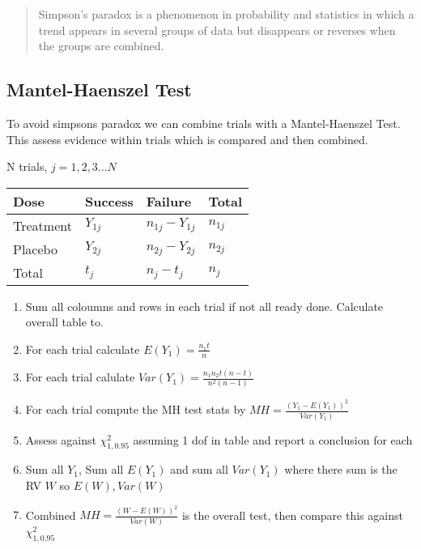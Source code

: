 \documentclass[
  letterpaper,
  DIV=11,
  numbers=noendperiod]{scrreprt}
\providecommand{\tightlist}{%
  \setlength{\itemsep}{0pt}\setlength{\parskip}{0pt}}\usepackage{longtable,booktabs,array}
\begin{document}
\begin{quote}
Simpson's paradox is a phenomenon in probability and statistics in which
a trend appears in several groups of data but disappears or reverses
when the groups are combined.
\end{quote}

\hypertarget{mantel-haenszel-test}{%
\subsection{Mantel-Haenszel Test}\label{mantel-haenszel-test}}

To avoid simpsons paradox we can combine trials with a Mantel-Haenszel
Test. This assess evidence within trials which is compared and then
combined.

N trials, \(j = 1,2,3 ... N\)

\begin{longtable}[]{@{}llll@{}}
\toprule()
Dose & Success & Failure & Total \\
\midrule()
\endhead
Treatment & \(Y_{1j}\) & \(n_{1j} - Y_{1j}\) & \(n_{1j}\) \\
Placebo & \(Y_{2j}\) & \(n_{2j} - Y_{2j}\) & \(n_{2j}\) \\
Total & \(t_j\) & \(n_{j} - t_{j}\) & \(n_{j}\) \\
\bottomrule()
\end{longtable}

\begin{enumerate}
\def\labelenumi{\arabic{enumi})}
\tightlist
\item
  Sum all coloumns and rows in each trial if not all ready done.
  Calculate overall table to.
\item
  For each trial calculate \(E(Y_1) = \frac{n_1 t}{n}\)
\item
  For each trial calulate \(Var(Y_1) = \frac{n_1 n_2 t(n-t)}{n^2(n-1)}\)
\item
  For each trial compute the MH test stats by
  \(MH = \frac{(Y_1 - E(Y_1))^2}{Var(Y_1)}\)
\item
  Assess against \(\chi^2_{1,0.95}\) assuming 1 dof in table and report
  a conclusion for each
\item
  Sum all \(Y_1\), Sum all \(E(Y_1)\) and sum all \(Var(Y_1)\) where
  there sum is the RV \(W\) so \(E(W), Var(W)\)
\item
  Combined \(MH = \frac{(W - E(W))^2}{Var(W)}\) is the overall test,
  then compare this against \(\chi^2_{1,0.95}\)
\end{enumerate}
\end{document}
